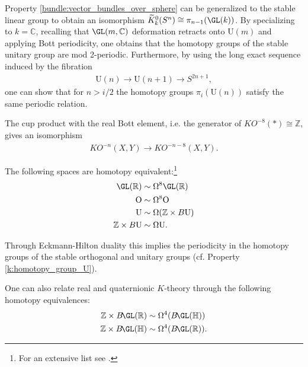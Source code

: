 {    \begin{property}\label{k:homotopy_group_U}
        Property \ref{bundle:vector_bundles_over_sphere} can be generalized to the stable linear group to obtain an isomorphism $\widetilde{K}^0_k(S^n)\cong\pi_{n-1}(\GL(k))$. By specializing to $k=\mathbb{C}$, recalling that $\GL(m,\mathbb{C})$ deformation retracts onto $\mathrm{U}(m)$ and applying Bott periodicity, one obtains that the homotopy groups of the stable unitary group are mod 2-periodic. Furthermore, by using the long exact sequence induced by the fibration
        \begin{gather}
            \mathrm{U}(n)\rightarrow\mathrm{U}(n+1)\rightarrow S^{2n+1},
        \end{gather}
        one can show that for $n>i/2$ the homotopy groups $\pi_i(\mathrm{U}(n))$ satisfy the same periodic relation.
    \end{property}

    \begin{theorem}
        The cup product with the real Bott element, i.e. the generator of $KO^{-8}(\ast)\cong\mathbb{Z}$, gives an isomorphism
        \begin{gather}
            KO^{-n}(X,Y)\rightarrow KO^{-n-8}(X,Y).
        \end{gather}
    \end{theorem}

    \begin{theorem}
        The following spaces are homotopy equivalent:\footnote{For an extensive list see \cite{karoubi}.}
        \begin{align}
            \GL(\mathbb{R})&\sim\Omega^8\GL(\mathbb{R})\\
            \mathrm{O}&\sim\Omega^8\mathrm{O}\nonumber\\
            \mathrm{U}&\sim\Omega(\mathbb{Z}\times B\mathrm{U})\\
            \mathbb{Z}\times B\mathrm{U}&\sim\Omega\mathrm{U}.
        \end{align}
    \end{theorem}
    \begin{result}
        Through Eckmann-Hilton duality this implies the periodicity in the homotopy groups of the stable orthogonal and unitary groups (cf. Property \ref{k:homotopy_group_U}).
    \end{result}
    \begin{property}
        One can also relate real and quaternionic $K$-theory through the following homotopy equivalences:
        \begin{align}
            \mathbb{Z}\times B\!\GL(\mathbb{R})&\sim\Omega^4(B\!\GL(\mathbb{H}))\\
            \mathbb{Z}\times B\!\GL(\mathbb{H})&\sim\Omega^4(B\!\GL(\mathbb{R})).
        \end{align}
    \end{property}

}
